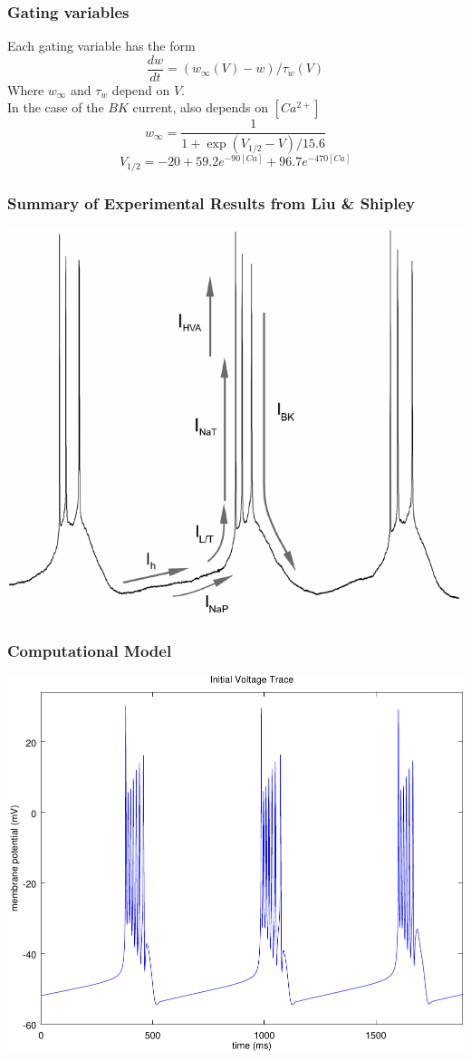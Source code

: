 \documentclass{beamer}
\theoremstyle{plain}
\theoremstyle{definition}
\begin{document}
 \begin{frame}\frametitle{Gating variables}
 Each gating variable has the form
 $$\frac{dw}{dt} = (w_{\infty}(V) - w)/\tau_{w}(V)$$
 Where $w_{\infty}$ and $\tau_{w}$ depend on $V$.\\
 \vspace{1em}
 In the case of the $BK$ current, also depends on $[Ca^{2+}]$
 $$w_{\infty} = \frac{1}{1 + \exp{(V_{1/2} - V)/15.6}}$$
 $$V_{1/2} = -20 + 59.2e^{-90[Ca]} + 96.7e^{-470[Ca]}$$
 \end{frame}

 \begin{frame}\frametitle{Summary of Experimental Results from Liu \& Shipley \cite{liu_multiple_2008}}
   \begin{center}
     \includegraphics[scale = .33]{summary.png}
   \end{center}
 \end{frame}

 \begin{frame}\frametitle{Computational Model}
   \begin{center}
     \includegraphics[scale = .5]{initialTrace.pdf}
   \end{center}
 \end{frame}
\end{document}
